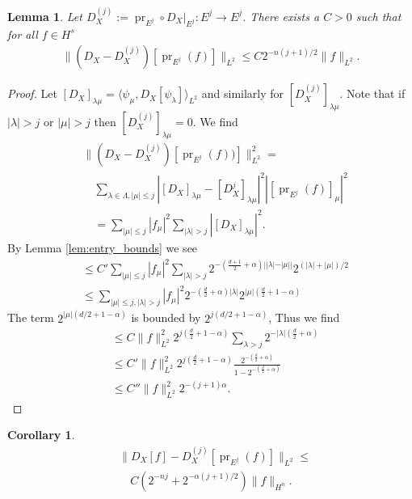\documentclass[letterpaper, 10 pt, conference]{ieeeconf}
\newtheorem{cor}[thm]{Corollary}
\newtheorem{lem}[thm]{Lemma}
\DeclareMathOperator{\pr}{pr}
\begin{document}
\begin{lem}  \label{lem:L2_to_Hn}
  Let $D_X^{(j)} := \pr_{E^j} \circ \left. D_X \right|_{E^j} : E^j \to E^j$.
  There exists a $C>0$ such that for all $f \in H^s$
  \begin{align}
    \| (D_X - D_X^{(j)})[\pr_{E^j}(f)] \|_{L^2} \leq C 2^{-n(j+1)/2} \| f\|_{L^2}.
  \end{align}
\end{lem}
\begin{proof}
  Let $[D_X]_{\lambda\mu} = \langle \psi_{\mu} , D_X[\psi_\lambda] \rangle_{L^2}$
and similarly for $[D_X^{(j)}]_{\lambda \mu}$.
Note that if $|\lambda|>j$ or $|\mu |>j$ then $[D_X^{(j)}]_{\lambda\mu} = 0$.
We find
  \begin{align*}
    &\| (D_X - D_X^{(j)}) [\pr_{E^j}(f))] \|^2_{L^2} = \\
    &\quad \sum_{\lambda \in \Lambda, |\mu | \leq j} \left| [D_X]_{\lambda\mu} - [D_X^j]_{\lambda\mu} \right|^2 |[ \pr_{E^j}(f)]_\mu|^2 \\
    &\quad = \sum_{|\mu|\leq j}| f_\mu |^2 \sum_{|\lambda| > j} | [D_X]_{\lambda\mu}|^2.
  \end{align*}
  By Lemma \ref{lem:entry_bounds} we see
  \begin{align*}
    &\leq C' \sum_{|\mu|\leq j} | f_\mu |^2  \sum_{|\lambda| > j } 
    2^{- \left( \frac{d+1}{2} + \alpha \right) | |\lambda| - |\mu| |}
    2^{ (|\lambda| + |\mu|)/2 }\\
    &\leq \sum_{|\mu | \leq j , |\lambda| > j}
    |f_\mu|^2 2^{ - \left( \frac{d}{2} + \alpha \right)|\lambda|} 
    2^{|\mu|\left(\frac{d}{2} + 1 - \alpha\right) }
  \end{align*}
  The term $2^{|\mu|( d/2 + 1 - \alpha)}$ is bounded 
  by $ 2^{j(d/2 + 1 - \alpha)}$,
  Thus we find
  \begin{align*}
    &\leq C \|f\|_{L^2}^2 2^{j \left( \frac{d}{2} + 1 - \alpha\right)} \sum_{\lambda > j}
      2^{-|\lambda|\left( \frac{d}{2} + \alpha\right)} \\
    &\leq C' \|f\|_{L^2}^2 2^{j \left( \frac{d}{2} + 1 - \alpha\right)}
    \frac{ 2^{ -\left(\frac{d}{2} + \alpha \right)}}{ 1 - 2^{-\left(\frac{d}{2} + \alpha\right)}} \\
    &\leq C'' \|f\|_{L^2}^2 2^{-(j+1) \alpha}.
  \end{align*}
\end{proof}
  \begin{cor} \label{cor:operator_bound}
    \begin{align*}
      &\| D_X [f] - D_X^{(j)} [\pr_{E^j}(f)] \|_{L^2} \leq \\
      &\quad C \left( 2^{-nj} + 2^{-\alpha(j+1)/2} \right) \|f\|_{H^n}.
    \end{align*}
  \end{cor}
\end{document}
